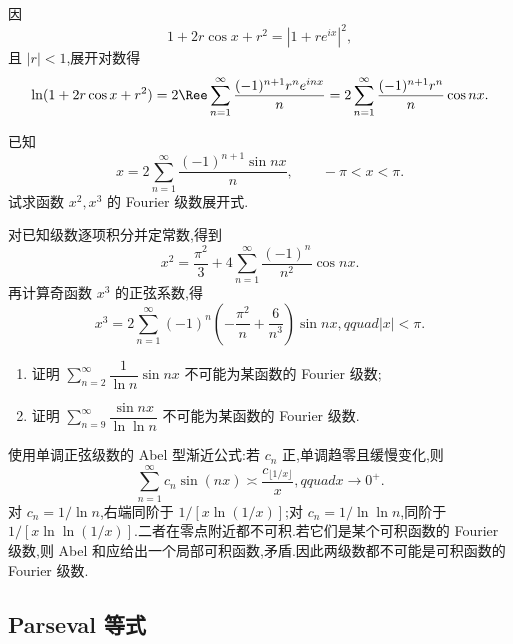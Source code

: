 \begin{solution}
    因
    \[
        1+2r\cos x+r^2=|1+re^{ix}|^2,
    \]
    且 $|r|<1$,展开对数得
    \[
        \ln(1+2r\cos x+r^2)
        =2\Ree\sum\limits_{n=1}^{\infty}\dfrac{(-1)^{n+1}r^ne^{inx}}n
        =2\sum\limits_{n=1}^{\infty}\dfrac{(-1)^{n+1}r^n}{n}\cos nx.
    \]
\end{solution}

\begin{example}
    已知
    \[
        x=2\sum\limits_{n=1}^{\infty}\dfrac{(-1)^{n+1}\sin nx}{n},
        \qquad -\pi<x<\pi.
    \]
    试求函数 $x^2,x^3$ 的 Fourier 级数展开式.
\end{example}
\exampleblank

\begin{solution}
    对已知级数逐项积分并定常数,得到
    \[
        x^2=\dfrac{\pi^2}{3}+4\sum\limits_{n=1}^{\infty}
        \dfrac{(-1)^n}{n^2}\cos nx.
    \]
    再计算奇函数 $x^3$ 的正弦系数,得
    \[
        x^3=2\sum\limits_{n=1}^{\infty}(-1)^n
        \left(-\dfrac{\pi^2}{n}+\dfrac{6}{n^3}\right)\sin nx,qquad |x|<\pi.
    \]
\end{solution}

\begin{example}
    \begin{enumerate}
        \item 证明 $\displaystyle\sum\limits_{n=2}^{\infty}\dfrac{1}{\ln n}\sin nx$ 不可能为某函数的 Fourier 级数;
        \item 证明 $\displaystyle\sum\limits_{n=9}^{\infty}\dfrac{\sin nx}{\ln\ln n}$ 不可能为某函数的 Fourier 级数.
    \end{enumerate}
\end{example}
\exampleblank

\begin{solution}
    使用单调正弦级数的 Abel 型渐近公式:若 $c_n$ 正,单调趋零且缓慢变化,则
    \[
        \displaystyle\sum\limits_{n=1}^{\infty}c_n\sin(nx)\asymp\dfrac{c_{\lfloor1/x\rfloor}}x,qquad x\to0^+.
    \]
    对 $c_n=1/\ln n$,右端同阶于 $1/[x\ln(1/x)]$;对
    $c_n=1/\ln\ln n$,同阶于 $1/[x\ln\ln(1/x)]$.二者在零点附近都不可积.若它们是某个可积函数的 Fourier 级数,则 Abel 和应给出一个局部可积函数,矛盾.因此两级数都不可能是可积函数的 Fourier 级数.
\end{solution}



\subsection{Parseval 等式}

